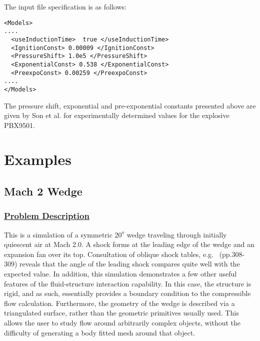 The input file specification is as follows:
\begin{verbatim}
<Models>
....
  <useInductionTime>  true </useInductionTime>
  <IgnitionConst> 0.00009 </IgnitionConst>
  <PressureShift> 1.0e5 </PressureShift>
  <ExponentialConst> 0.538 </ExponentialConst>
  <PreexpoConst> 0.00259 </PreexpoConst>
....
</Models> 
\end{verbatim}

The pressure shift, exponential and pre-exponential constants presented above are given by Son et al. \cite{flameProp} for experimentally determined values for the explosive PBX9501.


\newpage

\section{Examples} \label {Sec:MPMICE_EXAMPLES}

\subsection*{\center Mach 2 Wedge}
\subsubsection*{\underline{Problem Description}}
This is a simulation of a symmetric $20^o$ wedge traveling through initially
quiescent air at Mach 2.0.  A shock forms at the leading edge of the
wedge and an expansion fan over its top.  Consultation of oblique shock
tables, e.g.~\cite{ref:Saad} (pp.308-309) reveals that the angle of the leading
shock compares quite well with the expected value.  In addition, this
simulation demonstrates a few other useful features of the fluid-structure
interaction capability.  In this case, the structure is rigid, and as
such, essentially provides a boundary condition to the compressible flow
calculation.  Furthermore, the geometry of the wedge is described via a
triangulated surface, rather than the geometric primitives usually used.
This allows the user to study flow around arbitrarily complex objects,
without the difficulty of generating a body fitted mesh around that object.

